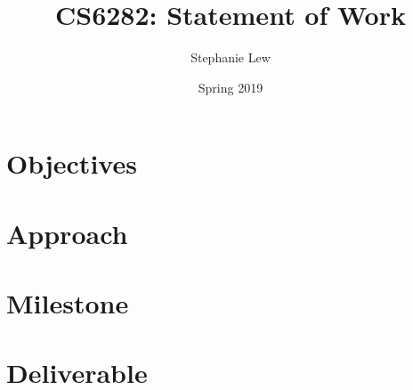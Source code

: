 \documentclass[11pt]{article}
\title{CS6282: Statement of Work}
\author{Stephanie Lew}
\date{Spring 2019}
\begin{document}
\section{Objectives}

\section{Approach}

\section{Milestone}

\section{Deliverable}

\pagebreak
\end{document}
